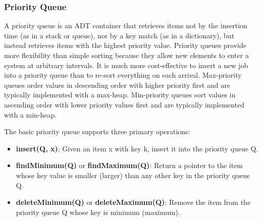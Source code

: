 \documentclass{article}
\begin{document}
    
    \subsubsection{Priority Queue}
    A priority queue is an ADT container that retrieves items not by the insertion time (as in a stack or queue), nor by a key match (as in a dictionary), but instead retrieves items with the highest priority value. Priority queues provide more flexibility than simple sorting because they allow new elements to enter a system at arbitrary intervals. It is much more cost-effective to insert a new job into a priority queue than to re-sort everything on each arrival. Max-priority queues order values in descending order with higher priority first and are typically implemented with a max-heap. Min-priority queues sort values in ascending order with lower priority values first and are typically implemented with a min-heap.
    
    The basic priority queue supports three primary operations:
    \begin{itemize}
        \item \textbf{insert(Q, x)}: Given an item x with key k, insert it into the priority queue Q.
        \item \textbf{findMinimum(Q)} or \textbf{findMaximum(Q)}: Return a pointer to the item whose key value is smaller (larger) than any other key in the priority queue Q.
        \item \textbf{deleteMinimum(Q)} or \textbf{deleteMaximum(Q)}: Remove the item from the priority queue Q whose key is minimum (maximum).
    \end{itemize}
\end{document}
